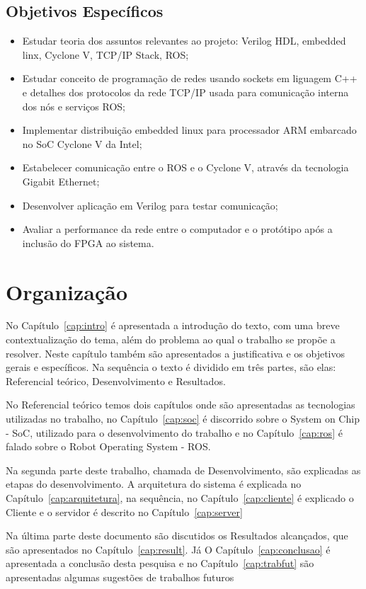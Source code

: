 \subsection{Objetivos Específicos}

\begin{itemize}
    \item Estudar teoria dos assuntos relevantes ao projeto: Verilog HDL, embedded linx,  Cyclone V, 
    TCP/IP Stack, ROS\@;
    \item Estudar conceito de programação de redes usando sockets em liguagem C++ e detalhes dos protocolos da rede TCP/IP usada para comunicação interna dos nós e serviços ROS\@;
    \item Implementar distribuição embedded linux para processador ARM embarcado no SoC Cyclone V da Intel;
    \item Estabelecer comunicação entre o ROS e o Cyclone V, através da tecnologia Gigabit Ethernet;
    \item Desenvolver aplicação em Verilog para testar comunicação;
    \item Avaliar a performance da rede entre o computador e o protótipo após a inclusão do FPGA ao sistema.
\end{itemize}


\section{Organização}

No Capítulo~\ref{cap:intro} é apresentada a introdução do texto, com uma breve contextualização do tema, além do problema ao qual o trabalho se propõe a resolver. Neste capítulo também são apresentados a justificativa e os objetivos gerais e específicos. Na sequência o texto é dividido em três partes, são elas: Referencial teórico, Desenvolvimento e Resultados.

No Referencial teórico temos dois capítulos onde são apresentadas as tecnologias utilizadas no trabalho, no Capítulo~\ref{cap:soc} é discorrido sobre o System on Chip - SoC, utilizado para o desenvolvimento do trabalho e no Capítulo~\ref{cap:ros} é falado sobre o Robot Operating System - ROS\@.

Na segunda parte deste trabalho, chamada de Desenvolvimento, são explicadas as etapas do desenvolvimento. A arquitetura do sistema é explicada no Capítulo~\ref{cap:arquitetura}, na sequência, no Capítulo~\ref{cap:cliente} é explicado o Cliente e o servidor é descrito no Capítulo~\ref{cap:server}

Na última parte deste documento são discutidos os Resultados alcançados, que são apresentados no Capítulo~\ref{cap:result}. Já O Capítulo~\ref{cap:conclusao} é apresentada a conclusão desta pesquisa e no Capítulo~\ref{cap:trabfut} são apresentadas algumas sugestões de trabalhos futuros 

